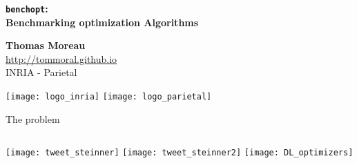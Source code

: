 \documentclass[unknownkeysallowed]{beamer}
\begin{document}


\begin{frame}
\bigskip
\bigskip
\begin{center}{
\LARGE\color{marron}
\textbf{\texttt{benchopt}:\\
		Benchmarking optimization Algorithms}
\textbf{ }\\
\vspace{0.5cm}
}

\color{marron}
\end{center}

\vspace{0.5cm}

\begin{center}
\textbf{Thomas Moreau} \\
\vspace{0.1cm}
\url{http://tommoral.github.io}\\
\vspace{0.5cm}
INRIA - Parietal \\
\end{center}

\centering
\texttt{[image: logo\_inria]}
\texttt{[image: logo\_parietal]}

\end{frame}


\begin{frame}[fragile]{The problem}

    \begin{columns}
        \texttt{[image: tweet\_steinner]}
        \texttt{[image: tweet\_steinner2]}
            \texttt{[image: DL\_optimizers]}
    \end{columns}

\end{frame}
\end{document}
